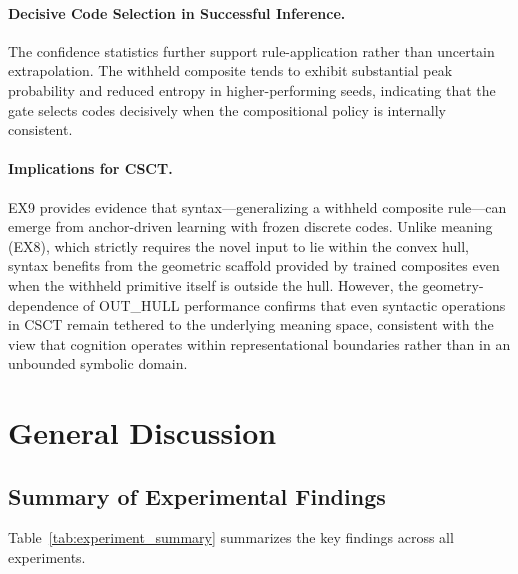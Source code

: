 \documentclass{article}
\begin{document}
\paragraph{Decisive Code Selection in Successful Inference.}
The confidence statistics further support rule-application rather than uncertain extrapolation.
The withheld composite tends to exhibit substantial peak probability and reduced entropy in higher-performing seeds, indicating that the gate selects codes decisively when the compositional policy is internally consistent.

\paragraph{Implications for CSCT.}
EX9 provides evidence that syntax---generalizing a withheld composite rule---can emerge from anchor-driven learning with frozen discrete codes.
Unlike meaning (EX8), which strictly requires the novel input to lie within the convex hull, syntax benefits from the geometric scaffold provided by trained composites even when the withheld primitive itself is outside the hull.
However, the geometry-dependence of OUT\_HULL performance confirms that even syntactic operations in CSCT remain tethered to the underlying meaning space, consistent with the view that cognition operates within representational boundaries rather than in an unbounded symbolic domain.
\clearpage
\section{General Discussion}

\subsection{Summary of Experimental Findings}

Table~\ref{tab:experiment_summary} summarizes the key findings across all experiments.
\end{document}
